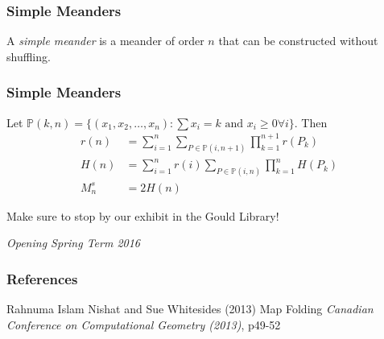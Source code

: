 \documentclass{beamer}
\begin{document}
\begin{frame}
\frametitle{Simple Meanders}
\begin{definition}
A \emph{simple meander} is a meander of order $n$ that can be constructed without shuffling.
\end{definition}
\end{frame}

\begin{frame}
\frametitle{Simple Meanders}
\renewcommand{\P}{\mathbb{P}}

\begin{theorem}
Let $\P(k,n) = \{(x_1,x_2,\ldots,x_n) : \sum x_i = k \text{ and } x_i\ge 0 \forall i\}$. Then
\begin{align*}
r(n) &= \sum_{i=1}^n\sum_{P\in\P(i,n+1)}\prod^{n+1}_{k = 1} r(P_k)\\
H(n) &= \sum_{i=1}^n r(i) \sum_{P\in\P(i,n)}\prod^{n}_{k = 1} H(P_k)\\
M^s_n &= 2H(n)
\end{align*}
\end{theorem}
\end{frame}

\begin{frame}
\begin{center}
\Huge{Make sure to stop by our exhibit in the Gould Library!}
\end{center}
\Large{\centerline{\emph{Opening Spring Term 2016}}}
\end{frame}





\begin{frame}
\frametitle{References}
\footnotesize{
\begin{thebibliography}{99} %



 Rahnuma Islam Nishat and Sue Whitesides (2013)
\newblock Map Folding
\newblock \emph{Canadian Conference on Computational Geometry (2013)}, p49-52

\end{thebibliography}
}
\end{frame}



\end{document}
